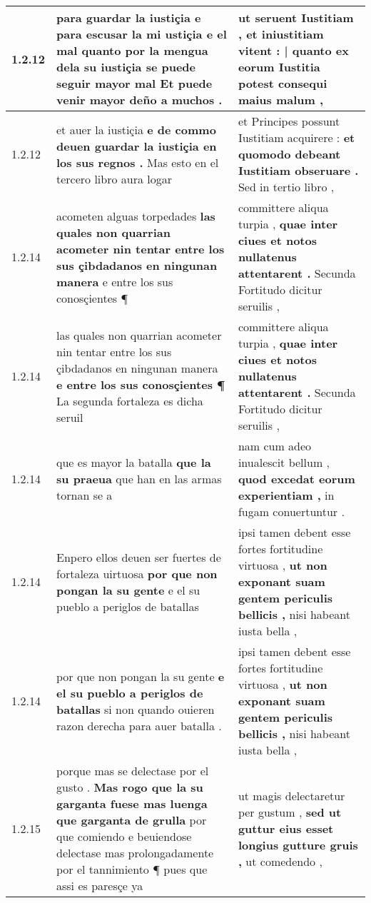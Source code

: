 \begin{tabular}{|p{1cm}|p{6.5cm}|p{6.5cm}|}
1.2.12 & para guardar la iustiçia \textbf{ e para escusar la mi ustiçia e el mal quanto por la mengua dela su iustiçia se puede seguir mayor mal } Et puede venir mayor deño a muchos . & ut seruent Iustitiam , \textbf{ et iniustitiam vitent : | quanto ex eorum Iustitia potest } consequi maius malum , \\\hline
1.2.12 & et auer la iustiçia \textbf{ e de commo deuen guardar la iustiçia en los sus regnos . } Mas esto en el tercero libro aura logar & et Principes possunt Iustitiam acquirere : \textbf{ et quomodo debeant Iustitiam obseruare . } Sed in tertio libro , \\\hline
1.2.14 & acometen alguas torpedades \textbf{ las quales non quarrian acometer nin tentar entre los sus çibdadanos en ningunan manera } e entre los sus conosçientes ¶ & committere aliqua turpia , \textbf{ quae inter ciues et notos nullatenus attentarent . } Secunda Fortitudo dicitur seruilis , \\\hline
1.2.14 & las quales non quarrian acometer nin tentar entre los sus çibdadanos en ningunan manera \textbf{ e entre los sus conosçientes ¶ } La segunda fortaleza es dicha seruil & committere aliqua turpia , \textbf{ quae inter ciues et notos nullatenus attentarent . } Secunda Fortitudo dicitur seruilis , \\\hline
1.2.14 & que es mayor la batalla \textbf{ que la su praeua } que han en las armas tornan se a & nam cum adeo inualescit bellum , \textbf{ quod excedat eorum experientiam , } in fugam conuertuntur . \\\hline
1.2.14 & Enpero ellos deuen ser fuertes de fortaleza uirtuosa \textbf{ por que non pongan la su gente } e el su pueblo a periglos de batallas & ipsi tamen debent esse fortes fortitudine virtuosa , \textbf{ ut non exponant suam gentem periculis bellicis , } nisi habeant iusta bella , \\\hline
1.2.14 & por que non pongan la su gente \textbf{ e el su pueblo a periglos de batallas } si non quando ouieren razon derecha para auer batalla . & ipsi tamen debent esse fortes fortitudine virtuosa , \textbf{ ut non exponant suam gentem periculis bellicis , } nisi habeant iusta bella , \\\hline
1.2.15 & porque mas se delectase por el gusto . \textbf{ Mas rogo que la su garganta fuese mas luenga que garganta de grulla } por que comiendo e beuiendose delectase mas prolongadamente por el tannimiento ¶ pues que assi es paresçe ya & ut magis delectaretur per gustum , \textbf{ sed ut guttur eius esset longius gutture gruis , } ut comedendo , \\\hline

\end{tabular}
